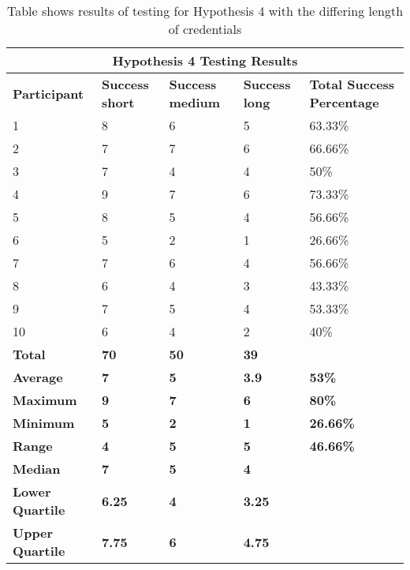 \documentclass{article}
\begin{document}
{
\begin{table} [H]
\centering
\begin{tabular}{ |p{2cm}|p{2cm}|p{2cm}| p{2cm}| p{2cm}| }
\hline
\multicolumn{5}{|c|}{\textbf{Hypothesis 4 Testing Results}} \\
\hline
\textbf{Participant} & \textbf{Success short} & \textbf{Success medium} & \textbf{Success long}  & \textbf{Total Success Percentage} \\
\hline
1 & 8 & 6 & 5 & 63.33\% \\
\hline
2 & 7 & 7 & 6 & 66.66\% \\
\hline
3 & 7 & 4 & 4 & 50\% \\
\hline
4 & 9 & 7 & 6 & 73.33\%  \\
\hline
5 & 8 & 5 & 4 & 56.66\% \\
\hline
6 & 5 & 2 & 1 & 26.66\% \\
\hline
7 & 7 & 6 & 4 & 56.66\% \\
\hline
8 & 6 & 4 & 3 & 43.33\% \\
\hline
9 & 7 & 5 & 4 & 53.33\% \\
\hline
10 & 6 & 4 & 2 & 40\% \\
\hline
\textbf{Total} & \textbf{70} & \textbf{50} & \textbf{39} & \\
\hline
\textbf{Average} & \textbf{7} & \textbf{5} & \textbf{3.9} & \textbf{53\%} \\
\hline
\textbf{Maximum} & \textbf{9} & \textbf{7} & \textbf{6} & \textbf{80\%} \\
\hline
\textbf{Minimum} & \textbf{5} & \textbf{2} & \textbf{1} & \textbf{26.66\%} \\
\hline
\textbf{Range} & \textbf{4} & \textbf{5} & \textbf{5} & \textbf{46.66\%} \\
\hline
\textbf{Median} & \textbf{7} & \textbf{5} & \textbf{4} & \\
\hline
\textbf{Lower Quartile} & \textbf{6.25} & \textbf{4} & \textbf{3.25} &  \\
\hline
\textbf{Upper Quartile}& \textbf{7.75} & \textbf{6} & \textbf{4.75} &  \\
\hline
\end{tabular}
\caption{Table shows results of testing for Hypothesis 4 with the differing length of credentials}
\label{table:5}
\end{table}
}
\end{document}
